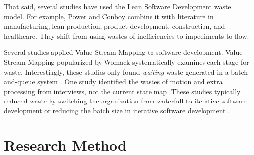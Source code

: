 That said, several studies have used the Lean Software Development waste model. For example, Power and Conboy combine it with literature in manufacturing, lean production, product development, construction, and healthcare. They shift from using wastes of inefficiencies to impediments to flow. \cite{PowerImpediments}


Several studies applied Value Stream Mapping to software development. Value Stream Mapping popularized by Womack systematically examines each stage for waste. Interestingly, these studies only found \textit{waiting} waste generated in a batch-and-queue system \cite{Ali2016, Khurum2014, Mujtaba2010}. One study identified the wastes of motion and extra processing from interviews, not the current state map \cite{Mujtaba2010}.These studies typically reduced waste by switching the organization from waterfall to iterative software development or reducing the batch size in iterative software development \cite{Ali2016, Khurum2014, Mujtaba2010}.



\section{Research Method}
\label{ResearchMethod}


